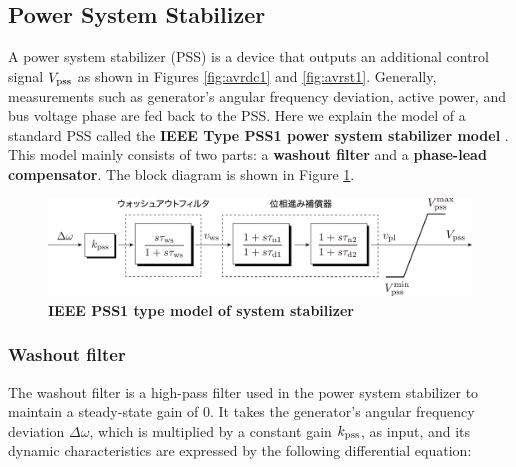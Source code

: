 \documentclass[graybox, envcountchap]{svmult}
\begin{document}
\subsection{Power System Stabilizer}\label{sec:pssintro}

A power system stabilizer (PSS) is a device that outputs an additional control
signal $V_{\rm pss}$ as shown in Figures \ref{fig:avrdc1} and \ref{fig:avrst1}.
Generally, measurements such as generator's angular frequency deviation, active
power, and bus voltage phase are fed back to the PSS. Here we explain the model
of a standard PSS called the \textbf{IEEE Type PSS1 power system stabilizer
model} \cite[Section
9.2]{ieee2016ieee}. This model mainly consists of two parts: a \textbf{washout
filter} and a \textbf{phase-lead
compensator}. The block diagram is shown in Figure 
\ref{fig:pss1}.

\begin{figure}[t]
  \centering
  \includegraphics[width = .99\linewidth]{figs/pss1}
  \medskip
  \caption{\textbf{IEEE PSS1 type model of system stabilizer}}
  \label{fig:pss1}
  \medskip
\end{figure}


\smallskip
\subsubsection{Washout filter}

The washout filter is a high-pass filter used in the power system stabilizer to
maintain a steady-state gain of 0. It takes the generator's angular frequency
deviation $\Delta \omega$, which is multiplied by a constant gain $k_{\rm pss}$,
as input, and its dynamic characteristics are expressed by the following
differential equation:
\end{document}

